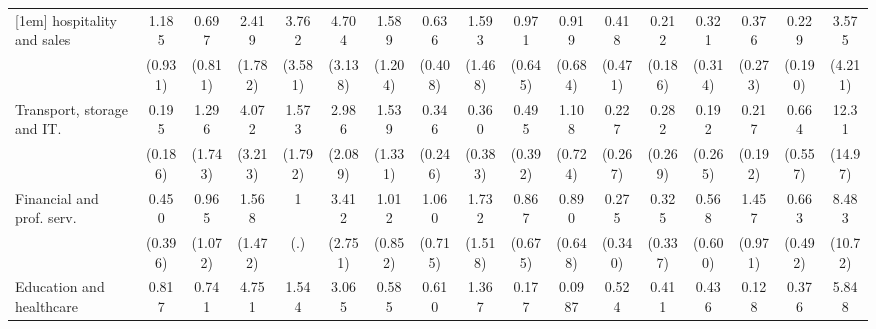{\begin{tabular}{l*{16}{c}}
[1em]
hospitality and sales&       1.185         &       0.697         &       2.419         &       3.762         &       4.704\sym{*}  &       1.589         &       0.636         &       1.593         &       0.971         &       0.919         &       0.418         &       0.212         &       0.321         &       0.376         &       0.229         &       3.575         \\
                    &     (0.931)         &     (0.811)         &     (1.782)         &     (3.581)         &     (3.138)         &     (1.204)         &     (0.408)         &     (1.468)         &     (0.645)         &     (0.684)         &     (0.471)         &     (0.186)         &     (0.314)         &     (0.273)         &     (0.190)         &     (4.211)         \\
[1em]
Transport, storage and IT.&       0.195         &       1.296         &       4.072         &       1.573         &       2.986         &       1.539         &       0.346         &       0.360         &       0.495         &       1.108         &       0.227         &       0.282         &       0.192         &       0.217         &       0.664         &       12.31\sym{*}  \\
                    &     (0.186)         &     (1.743)         &     (3.213)         &     (1.792)         &     (2.089)         &     (1.331)         &     (0.246)         &     (0.383)         &     (0.392)         &     (0.724)         &     (0.267)         &     (0.269)         &     (0.265)         &     (0.192)         &     (0.557)         &     (14.97)         \\
[1em]
Financial and prof. serv.&       0.450         &       0.965         &       1.568         &           1         &       3.412         &       1.012         &       1.060         &       1.732         &       0.867         &       0.890         &       0.275         &       0.325         &       0.568         &       1.457         &       0.663         &       8.483         \\
                    &     (0.396)         &     (1.072)         &     (1.472)         &         (.)         &     (2.751)         &     (0.852)         &     (0.715)         &     (1.518)         &     (0.675)         &     (0.648)         &     (0.340)         &     (0.337)         &     (0.600)         &     (0.971)         &     (0.492)         &     (10.72)         \\
[1em]
Education and healthcare&       0.817         &       0.741         &       4.751         &       1.544         &       3.065         &       0.585         &       0.610         &       1.367         &       0.177         &      0.0987\sym{*}  &       0.524         &       0.411         &       0.436         &       0.128         &       0.376         &       5.848         \\

\end{tabular}}
